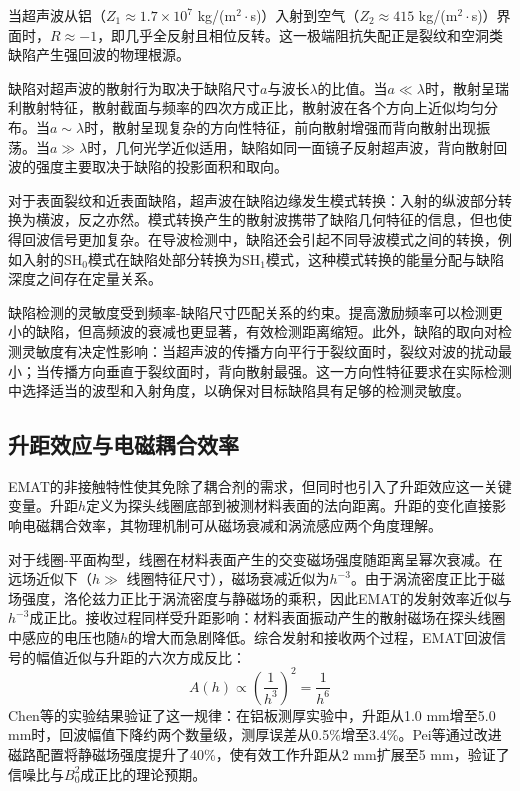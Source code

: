 当超声波从铝（$Z_1 \approx 1.7 \times 10^7$ kg/(m$^2\cdot$s)）入射到空气（$Z_2 \approx 415$ kg/(m$^2\cdot$s)）界面时，$R \approx -1$，即几乎全反射且相位反转。这一极端阻抗失配正是裂纹和空洞类缺陷产生强回波的物理根源。

缺陷对超声波的散射行为取决于缺陷尺寸$a$与波长$\lambda$的比值\cite{rose2014ultrasonic}。当$a \ll \lambda$时，散射呈瑞利散射特征，散射截面与频率的四次方成正比，散射波在各个方向上近似均匀分布。当$a \sim \lambda$时，散射呈现复杂的方向性特征，前向散射增强而背向散射出现振荡。当$a \gg \lambda$时，几何光学近似适用，缺陷如同一面镜子反射超声波，背向散射回波的强度主要取决于缺陷的投影面积和取向。

对于表面裂纹和近表面缺陷，超声波在缺陷边缘发生模式转换：入射的纵波部分转换为横波，反之亦然。模式转换产生的散射波携带了缺陷几何特征的信息，但也使得回波信号更加复杂。在导波检测中，缺陷还会引起不同导波模式之间的转换，例如入射的SH$_0$模式在缺陷处部分转换为SH$_1$模式，这种模式转换的能量分配与缺陷深度之间存在定量关系\cite{miao2021shear}。

缺陷检测的灵敏度受到频率-缺陷尺寸匹配关系的约束。提高激励频率可以检测更小的缺陷，但高频波的衰减也更显著，有效检测距离缩短。此外，缺陷的取向对检测灵敏度有决定性影响：当超声波的传播方向平行于裂纹面时，裂纹对波的扰动最小；当传播方向垂直于裂纹面时，背向散射最强。这一方向性特征要求在实际检测中选择适当的波型和入射角度，以确保对目标缺陷具有足够的检测灵敏度。

\subsection{升距效应与电磁耦合效率}

EMAT的非接触特性使其免除了耦合剂的需求，但同时也引入了升距效应这一关键变量。升距$h$定义为探头线圈底部到被测材料表面的法向距离。升距的变化直接影响电磁耦合效率，其物理机制可从磁场衰减和涡流感应两个角度理解。

对于线圈-平面构型，线圈在材料表面产生的交变磁场强度随距离呈幂次衰减。在远场近似下（$h \gg$ 线圈特征尺寸），磁场衰减近似为$h^{-3}$\cite{kawashima1976theory}。由于涡流密度正比于磁场强度，洛伦兹力正比于涡流密度与静磁场的乘积，因此EMAT的发射效率近似与$h^{-3}$成正比。接收过程同样受升距影响：材料表面振动产生的散射磁场在探头线圈中感应的电压也随$h$的增大而急剧降低。综合发射和接收两个过程，EMAT回波信号的幅值近似与升距的六次方成反比：
\begin{equation}
A(h) \propto \left(\frac{1}{h^3}\right)^2 = \frac{1}{h^6}
\label{eq:liftoff_decay}
\end{equation}
Chen等\cite{chen2024novel}的实验结果验证了这一规律：在铝板测厚实验中，升距从1.0 mm增至5.0 mm时，回波幅值下降约两个数量级，测厚误差从0.5\%增至3.4\%。Pei等\cite{pei2016modified}通过改进磁路配置将静磁场强度提升了40\%，使有效工作升距从2 mm扩展至5 mm，验证了信噪比与$B_0^2$成正比的理论预期。

